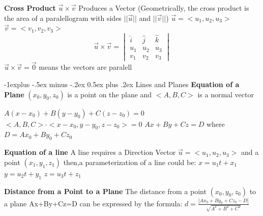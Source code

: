 \documentclass[10pt,landscape]{article}
\makeatletter
\renewcommand{\subsection}{\@startsection{subsection}{2}{0mm}%
                                {-1explus -.5ex minus -.2ex}%
                                {0.5ex plus .2ex}%
                                {\normalfont\normalsize\bfseries}}
\makeatother
\begin{document}
\begin{multicols*}{5}
\textbf{Cross Product}\newline
$\vec{u} \times \vec{v}$\newline
Produces a Vector\newline
(Geometrically, the cross product is the area of a paralellogram with sides $ ||\vec{u}|| $ and $ ||\vec{v}|| $)\newline
$\vec{u} = < u_1, u_2, u_3 >$\newline
$\vec{v} = < v_1, v_2, v_3 >$\newline
\[
\vec{u} \times \vec{v} = 
\begin{vmatrix}
\hat{i} & \hat{j} & \hat{k} \\
u_1 & u_2 & u_3 \\
v_1 & v_2 & v_3
\end{vmatrix}
\]\newline 
$ \vec{u} \times \vec{v} = \vec{0} $ means the vectors are paralell

\subsection {Lines and Planes}
\textbf{Equation of a Plane}\newline
$ (x_0, y_0, z_0) $ is a point on the plane and $ <A,B,C> $ is a normal vector\newline

$A(x-x_0)+B(y-y_0)+C(z-z_0) = 0$\newline
$ <A,B,C> \cdot <x-x_0, y-y_0, z-z_0> = 0 $\newline
$ Ax+By+Cz = D $ where $ D=Ax_0+By_0+Cz_0 $\newline

\textbf{Equation of a line}\newline
A line requires a Direction Vector $ \vec{u}=<u_1,u_2,u_3> $ and a point $(x_1,y_1,z_1)$\newline
then,\newline a parameterization of a line could be:\newline
$ x = u_1t+x_1 $\newline
$ y = u_2t+y_1 $\newline
$ z = u_3t+z_1 $\newline

\textbf{Distance from a Point to a Plane}\newline
The distance from a point $(x_0,y_0,z_0)$ to a plane Ax+By+Cz=D can be expressed by the formula:\newline
$ d=\frac{|Ax_0+By_0+Cz_0-D|}{\sqrt{A^2+B^2+C^2}} $\newline



\end{multicols*}
\end{document}
